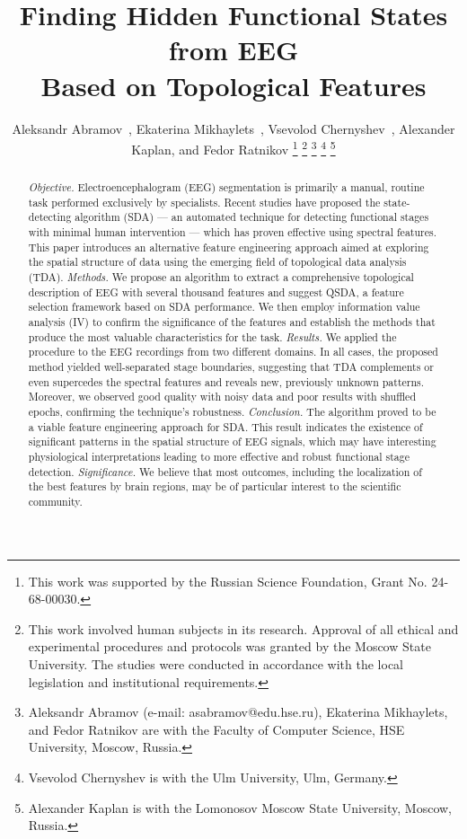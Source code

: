 \documentclass[journal,twoside,web]{ieeecolor2}
\begin{document}
\title{Finding Hidden Functional States from EEG \\Based on Topological Features}
\author{
  Aleksandr Abramov~, Ekaterina Mikhaylets~, Vsevolod Chernyshev~, Alexander Kaplan, and Fedor Ratnikov
  \thanks{This work was supported by the Russian Science Foundation, Grant No. 24-68-00030.}
  \thanks{This work involved human subjects in its research. Approval of all ethical and experimental procedures and protocols was granted by the Moscow State University. The studies were conducted in accordance with the local legislation and institutional requirements.}
  \thanks{Aleksandr Abramov (e-mail: asabramov@edu.hse.ru), Ekaterina Mikhaylets, and Fedor Ratnikov are with the Faculty of Computer Science, HSE University, Moscow, Russia.}
  \thanks{Vsevolod Chernyshev is with the Ulm University, Ulm, Germany.}
  \thanks{Alexander Kaplan is with the Lomonosov Moscow State University, Moscow, Russia.}
}

\maketitle

\begin{abstract}
\textit{Objective.}
Electroencephalogram (EEG) segmentation is primarily a manual, routine task performed exclusively by specialists. Recent studies have proposed the state-detecting algorithm (SDA) --- an automated technique for detecting functional stages with minimal human intervention --- which has proven effective using spectral features. This paper introduces an alternative feature engineering approach aimed at exploring the spatial structure of data using the emerging field of topological data analysis (TDA).
\textit{Methods.}
We propose an algorithm to extract a comprehensive topological description of EEG with several thousand features and suggest QSDA, a feature selection framework based on SDA performance. We then employ information value analysis (IV) to confirm the significance of the features and establish the methods that produce the most valuable characteristics for the task.
\textit{Results.}
We applied the procedure to the EEG recordings from two different domains. In all cases, the proposed method yielded well-separated stage boundaries, suggesting that TDA complements or even supercedes the spectral features and reveals new, previously unknown patterns. Moreover, we observed good quality with noisy data and poor results with shuffled epochs, confirming the technique's robustness. 
\textit{Conclusion.}
The algorithm proved to be a viable feature engineering approach for SDA. This result indicates the existence of significant patterns in the spatial structure of EEG signals, which may have interesting physiological interpretations leading to more effective and robust functional stage detection. 
\textit{Significance.}
We believe that most outcomes, including the localization of the best features by brain regions, may be of particular interest to the scientific community.
\end{abstract}
\end{document}
